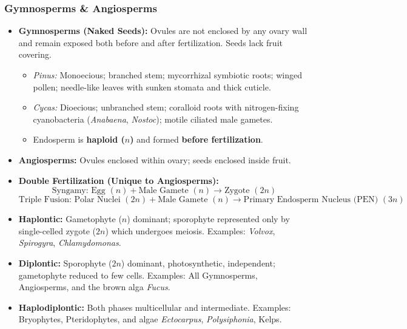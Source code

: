 \documentclass[11pt,a4paper]{article}
\begin{document}
\subsubsection{Gymnosperms \& Angiosperms}
\begin{itemize}[leftmargin=1.5em, itemsep=2pt]
  \item \textbf{Gymnosperms (Naked Seeds):} Ovules are not enclosed by any ovary wall and remain exposed both before and after fertilization. Seeds lack fruit covering.
  \begin{itemize}[label=$\circ$]
    \item \textit{Pinus:} Monoecious; branched stem; mycorrhizal symbiotic roots; winged pollen; needle-like leaves with sunken stomata and thick cuticle.
    \item \textit{Cycas:} Dioecious; unbranched stem; coralloid roots with nitrogen-fixing cyanobacteria (\textit{Anabaena}, \textit{Nostoc}); motile ciliated male gametes.
    \item Endosperm is \textbf{haploid ($n$)} and formed \textbf{before fertilization}.
  \end{itemize}
  \item \textbf{Angiosperms:} Ovules enclosed within ovary; seeds enclosed inside fruit.
  \item \textbf{Double Fertilization (Unique to Angiosperms):}
  \[
    \text{Syngamy: } \text{Egg } (n) + \text{Male Gamete } (n) \xrightarrow{} \text{Zygote } (2n)
  \]
  \[
    \text{Triple Fusion: } \text{Polar Nuclei } (2n) + \text{Male Gamete } (n) \xrightarrow{} \text{Primary Endosperm Nucleus (PEN) } (3n)
  \]
\end{itemize}

\begin{biobox}
\begin{itemize}[leftmargin=1.2em, itemsep=2pt]
  \item \textbf{Haplontic:} Gametophyte ($n$) dominant; sporophyte represented only by single-celled zygote ($2n$) which undergoes meiosis. Examples: \textit{Volvox}, \textit{Spirogyra}, \textit{Chlamydomonas}.
  \item \textbf{Diplontic:} Sporophyte ($2n$) dominant, photosynthetic, independent; gametophyte reduced to few cells. Examples: All Gymnosperms, Angiosperms, and the brown alga \textit{Fucus}.
  \item \textbf{Haplodiplontic:} Both phases multicellular and intermediate. Examples: Bryophytes, Pteridophytes, and algae \textit{Ectocarpus}, \textit{Polysiphonia}, Kelps.
\end{itemize}
\end{biobox}
\end{document}
